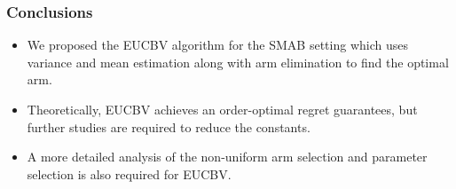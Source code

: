 \begin{frame}
\frametitle{Conclusions}
\begin{itemize}
\item<1-> We proposed the EUCBV algorithm for the SMAB setting which uses variance and mean estimation along with arm elimination to find the optimal arm.
\item<2-> Theoretically, EUCBV achieves an order-optimal regret guarantees, but further studies are required to reduce the constants.
\item<3-> A more detailed analysis of the non-uniform arm selection and parameter selection is also required for EUCBV.
\end{itemize}
\end{frame}
